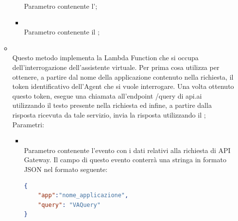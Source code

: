 \begin{itemize}
\begin{itemize}
\begin{itemize}
			Parametro contenente l';
			\item {} \\
			Parametro contenente il ;
		\end{itemize}
		\item[]  \\		Questo metodo implementa la Lambda Function che si occupa dell'interrogazione dell'assistente virtuale. Per prima cosa utilizza  per ottenere, a partire dal nome della applicazione contenuto nella richiesta, il token identificativo dell'Agent che si vuole interrogare. Una volta ottenuto questo token, esegue una chiamata all'endpoint /query di api.ai  utilizzando il testo presente nella richiesta ed infine, a partire dalla risposta ricevuta da tale servizio, invia la risposta utilizzando il ;\\
		Parametri:
		\begin{itemize}
			\item {} \\
			Parametro contenente l'evento con i dati relativi alla richiesta di API Gateway. Il campo  di questo evento conterrà una stringa in formato JSON nel formato seguente:

\begin{lstlisting}[language=json,firstnumber=1]
{
    "app":"nome_applicazione",
    "query": "VAQuery"
}
\end{lstlisting}


\end{itemize}
\end{itemize}
\end{itemize}
